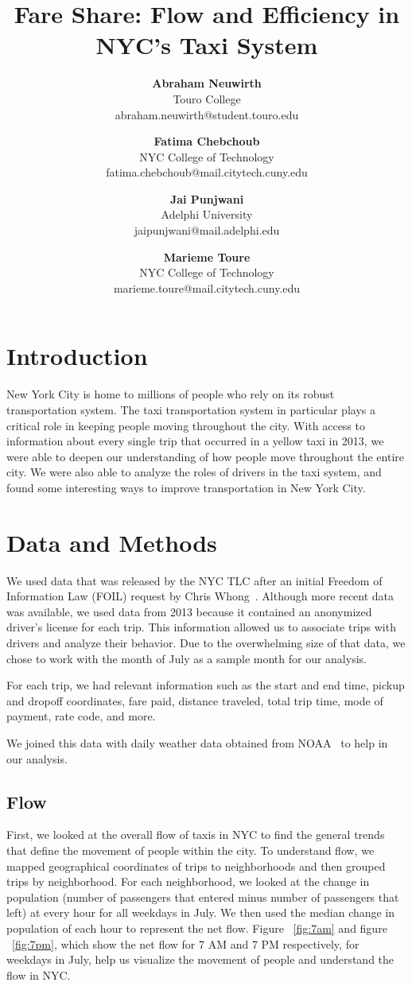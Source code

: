 \documentclass[twocolumn]{article}
\title{\vspace{-0.25in}Fare Share: Flow and Efficiency in NYC's Taxi System}
\author{
\normalsize{\textbf{Abraham Neuwirth}}\\ 
\small Touro College \\ 
\small abraham.neuwirth@student.touro.edu
\and 
\normalsize{\textbf{Fatima Chebchoub}}\\ 
\small NYC College of Technology\\ 
\small fatima.chebchoub@mail.citytech.cuny.edu 
\and 
\normalsize{\textbf{Jai Punjwani}}\\
\small Adelphi University\\
\small jaipunjwani@mail.adelphi.edu 
\and 
\normalsize{\textbf{Marieme Toure}}\\ 
\small NYC College of Technology\\ 
\small marieme.toure@mail.citytech.cuny.edu
}
\date{\vspace{-5ex}}
\begin{document}
\twocolumn[
\begin{@twocolumnfalse}
\maketitle

\end{@twocolumnfalse}
]
\section{Introduction}
New York City is home to millions of people who rely on its robust transportation system. The taxi transportation system in particular plays a critical role in keeping people moving throughout the city. With access to information about every single trip that occurred in a yellow taxi in 2013, we were able to deepen our understanding of how people move throughout the entire city. We were also able to analyze the roles of drivers in the taxi system, and found some interesting ways to improve transportation in New York City. 

\section{Data and Methods}
We used data that was released by the NYC TLC after an initial Freedom of Information Law (FOIL) request by Chris Whong~\cite{Whong:2014}. Although more recent data was available, we used data from 2013 because it contained an anonymized driver’s license for each trip. This information allowed us to associate trips with drivers and analyze their behavior. Due to the overwhelming size of that data, we chose to work with the month of July as a sample month for our analysis.

For each trip, we had relevant information such as the start and end time, pickup and dropoff coordinates, fare paid, distance traveled, total trip time, mode of payment, rate code, and more.

We joined this data with daily weather data obtained from NOAA~\cite{NOAA:2016} to help in our analysis. 
\subsection{Flow}
First, we looked at the overall flow of taxis in NYC to find the general trends that define the movement of people within the city. To understand flow, we mapped geographical coordinates of trips to neighborhoods and then grouped trips by neighborhood. For each neighborhood, we looked at the change in population (number of passengers that entered minus number of passengers that left) at every hour for all weekdays in July. We then used the median change in population of each hour to represent the net flow. Figure ~\ref{fig:7am} and figure ~\ref{fig:7pm}, which show the net flow for 7 AM and 7 PM respectively, for weekdays in July, help us visualize the movement of people and understand the flow in NYC.
\end{document}
